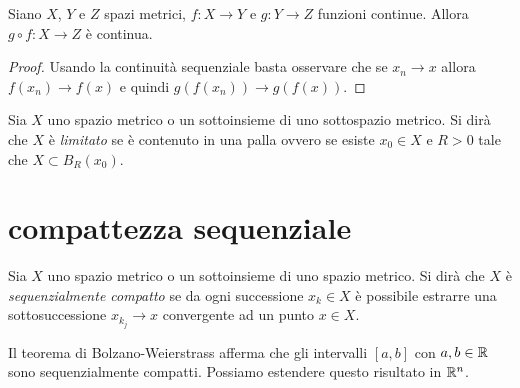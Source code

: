 \begin{theorem}%
  \label{th:continuita_funzione_composta_metrico}%
Siano $X$, $Y$ e $Z$ spazi metrici, $f\colon X\to Y$ 
e $g\colon Y\to Z$ funzioni continue. 
Allora $g\circ f\colon X\to Z$ è continua.
\end{theorem}
\begin{proof}
  Usando la continuità sequenziale basta osservare che 
  se $x_n\to x$ allora $f(x_n)\to f(x)$ e quindi $g(f(x_n))\to g(f(x))$.
\end{proof}

\begin{definition}%
  \label{def:spazio_limitato}%
\mymark{*}%
Sia $X$ uno spazio metrico o un sottoinsieme di uno sottospazio metrico. Si dirà che $X$ è
\emph{limitato}%
 se è contenuto in una palla ovvero se
esiste $x_0\in X$ e $R>0$ tale che $X\subset B_R(x_0)$.
\end{definition}

\section{compattezza sequenziale}

\begin{definition}%
  \label{def:sequenzialmente_compatto}%
\mymark{**}%
Sia $X$ uno spazio metrico o un sottoinsieme di uno
spazio metrico. Si dirà che $X$ è
\emph{sequenzialmente compatto}%
 se da ogni
successione $x_k \in X$ è possibile estrarre una sottosuccessione $x_{k_j}\to x$
convergente ad un punto $x\in X$.
\end{definition}

Il teorema di Bolzano-Weierstrass afferma che gli intervalli $[a,b]$ con
$a,b\in {\mathbb R}$ sono sequenzialmente compatti. 
Possiamo estendere questo risultato in ${\mathbb R}^n$.

